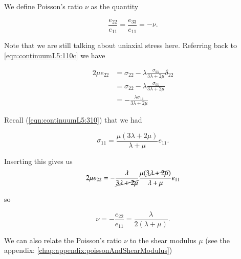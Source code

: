 

We define Poisson's ratio $\nu$ as the quantity

\begin{equation}\label{eqn:continuumL5:350}
\frac{e_{22}}{e_{11}} = \frac{e_{33}}{e_{11}} = - \nu.
\end{equation}

Note that we are still talking about uniaxial stress here.  Referring back to \ref{eqn:continuumL5:110c} we have

\begin{align*}
2 \mu e_{2 2}
&= \sigma_{2 2} - \lambda \frac{\sigma_{k k}}{3 \lambda + 2 \mu} \delta_{2 2} \\
&= \sigma_{2 2} - \lambda \frac{\sigma_{k k}}{3 \lambda + 2 \mu} \\
&= - \frac{\lambda \sigma_{11}}{3 \lambda + 2 \mu}
\end{align*}

Recall (\ref{eqn:continuumL5:310}) that we had

\begin{equation}\label{eqn:continuumL5:370}
\sigma_{11} = \frac{\mu (3 \lambda + 2 \mu)}{\lambda + \mu} e_{11}.
\end{equation}

Inserting this gives us
\begin{align*}
2 \mu e_{22} 
= - \frac{\lambda}{\cancel{3 \lambda + 2 \mu}} \frac{ \mu (\cancel{3 \lambda + 2\mu})}{\lambda + \mu} e_{11}
\end{align*}

so

\begin{equation}\label{eqn:continuumL5:410}
\boxed{
\nu = -\frac{e_{22}}{e_{11}} = \frac{\lambda}{2 (\lambda + \mu)}.
}
\end{equation}

We can also relate the Poisson's ratio $\nu$ to the shear modulus $\mu$ (see the appendix: \ref{chap:appendix:poissonAndShearModulus})

